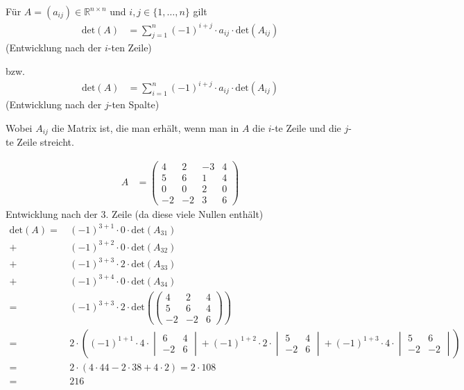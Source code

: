 

Für $A = (a_{ij}) \in \mathbb{R}^{n \times n}$ und $i, j \in \{1,\dots,n\}$ gilt
\begin{align*}
	\text{det}(A) &= \sum_{j=1}^{n}(-1)^{i+j} \cdot a_{ij} \cdot \text{det}(A_{ij})
\end{align*}
(Entwicklung nach der $i$-ten Zeile)

bzw.
\begin{align*}
	\text{det}(A) &= \sum_{i=1}^{n}(-1)^{i+j} \cdot a_{ij} \cdot \text{det}(A_{ij})
\end{align*}
(Entwicklung nach der $j$-ten Spalte)

Wobei $A_{ij}$ die Matrix ist, die man erhält, wenn man in $A$ die $i$-te Zeile und die $j$-te Zeile streicht.

\begin{align*}
	A &= \begin{pmatrix}
		4 & 2 & -3 & 4 \\
		5 & 6 & 1 & 4 \\
		0 & 0 & 2 & 0 \\
		-2 & -2 &3 & 6
	\end{pmatrix}
\end{align*}
Entwicklung nach der 3. Zeile (da diese viele Nullen enthält)
\begin{align*}
	\text{det}(A) =\,&(-1)^{3+1} \cdot 0 \cdot \text{det}(A_{31}) \\
	+\,&(-1)^{3+2} \cdot 0 \cdot \text{det}(A_{32}) \\
	+\,&(-1)^{3+3} \cdot 2 \cdot \text{det}(A_{33}) \\
	+\,&(-1)^{3+4} \cdot 0 \cdot \text{det}(A_{34}) \\
	=\,&(-1)^{3+3} \cdot 2 \cdot \text{det}\left(\begin{pmatrix}
		4 & 2 & 4 \\
		5 & 6 & 4 \\
		-2 & -2 & 6
	\end{pmatrix}\right) \\
	=\,&2\cdot\left((-1)^{1+1} \cdot 4 \cdot \begin{vmatrix}
		6 & 4 \\
		-2 & 6
	\end{vmatrix} + (-1)^{1+2} \cdot 2 \cdot \begin{vmatrix}
		5 & 4 \\
		-2 & 6
	\end{vmatrix} + (-1)^{1+3} \cdot 4 \cdot \begin{vmatrix}
		5 & 6 \\
		-2 & -2
	\end{vmatrix}\right) \\
	=\,&2 \cdot (4 \cdot 44 - 2 \cdot 38 + 4 \cdot 2) = 2 \cdot 108 \\
	=\,&216
\end{align*}

